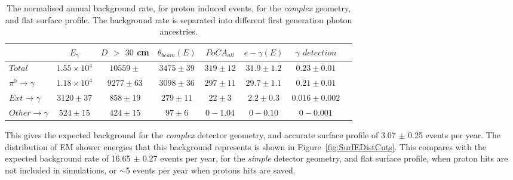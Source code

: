 \begin{table}[h!]
  \caption[The normalised annual background rate, for proton induced events, for the \emph{complex} geometry, and flat surface profile]
          {The normalised annual background rate, for proton induced events, for the \emph{complex} geometry, and flat surface profile. The background rate is separated into different first generation photon ancestries.}
  \label{tab:SurfProComp}
  \centering
  \scriptsize
  \begin{tabular}{l c c c c c c c }
    \toprule
        & $E_\gamma$ &  $D$ $>$ $30$ cm & $\theta_{beam}(E)$ & $PoCA_{all}$ & $e-\gamma(E)$ & $\gamma$ $detection$ \\
        \midrule
        $Total$          & $1.55\times10^4$ & $10559\pm$ & $3475\pm39$ & $319\pm12$ & $31.9\pm1.2$ & $0.23\pm0.01$ \\

        $\pi^0\to\gamma$ & $1.18\times10^4$ & $9277\pm63$  & $3098\pm36$ & $297\pm11$ & $29.7\pm1.1$ & $0.21\pm0.01$ \\

        $Ext\to\gamma$   & $3120\pm37$      & $858\pm19$   & $279\pm11$  & $22\pm3$   & $2.2\pm0.3$  & $0.016\pm0.002$ \\

        $Other\to\gamma$ & $524\pm15$       & $424\pm15$   & $97\pm6$    & $0-1.04$   & $0-0.10$     & $0-0.001$ \\
        \bottomrule
  \end{tabular}
\end{table}

This gives the expected background for the \emph{complex} detector geometry, and accurate surface profile of 3.07 $\pm$ 0.25 events per year. The distribution of EM shower energies that this background represents is shown in Figure~\ref{fig:SurfEDistCuts}. This compares with the expected background rate of 16.65 $\pm$ 0.27 events per year, for the \emph{simple} detector geometry, and flat surface profile, when proton hits are not included in simulations, or $\sim$5 events per year when protons hits are saved. \\

